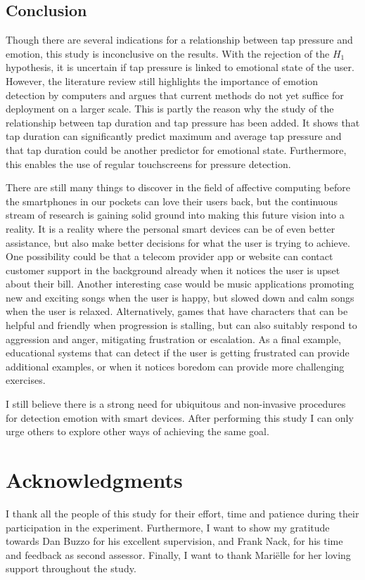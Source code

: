 \documentclass{sigchi}
\begin{document}
\subsection{Conclusion} %
\label{sub:conclusion}
Though there are several indications for a relationship between tap pressure and emotion, this study is inconclusive on the results. With the rejection of the $H_1$ hypothesis, it is uncertain if tap pressure is linked to emotional state of the user. However, the literature review still highlights the importance of emotion detection by computers and argues that current methods do not yet suffice for deployment on a larger scale. This is partly the reason why the study of the relationship between tap duration and tap pressure has been added. It shows that tap duration can significantly predict maximum and average tap pressure and that tap duration could be another predictor for emotional state. Furthermore, this enables the use of regular touchscreens for pressure detection.

There are still many things to discover in the field of affective computing before the smartphones in our pockets can love their users back, but the continuous stream of research is gaining solid ground into making this future vision into a reality. It is a reality where the personal smart devices can be of even better assistance, but also make better decisions for what the user is trying to achieve. One possibility could be that a telecom provider app or website can contact customer support in the background already when it notices the user is upset about their bill. Another interesting case would be music applications promoting new and exciting songs when the user is happy, but slowed down and calm songs when the user is relaxed. Alternatively, games that have characters that can be helpful and friendly when progression is stalling, but can also suitably respond to aggression and anger, mitigating frustration or escalation. As a final example, educational systems that can detect if the user is getting frustrated can provide additional examples, or when it notices boredom can provide more challenging exercises.

I still believe there is a strong need for ubiquitous and non-invasive procedures for detection emotion with smart devices. After performing this study I can only urge others to explore other ways of achieving the same goal.

\section{Acknowledgments} %
\label{sec:acknowledgments}
I thank all the people of this study for their effort, time and patience during their participation in the experiment. Furthermore, I want to show my gratitude towards Dan Buzzo for his excellent supervision, and Frank Nack, for his time and feedback as second assessor. Finally, I want to thank Mari\"{e}lle for her loving support throughout the study.
\end{document}
